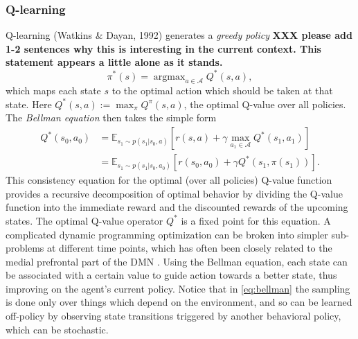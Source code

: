 \documentclass[10pt,letterpaper]{article}
\DeclareMathOperator{\argmax}{argmax}
\begin{document}
\subsubsection{Q-learning} Q-learning (Watkins \& Dayan, 1992) generates a
\textit{greedy policy}
\textbf{XXX please add 1-2 sentences why this is interesting in the current
context. This statement appears a little alone as it stands.}
\begin{equation}
  \pi^*(s) = \argmax_{a \in \mathcal A}{Q}^*(s, a),
  \label{eq:qlearning}
\end{equation}
which maps each state $s$ to the optimal action which should be taken at that state.
Here $Q^*(s, a) := \max_{\pi}Q^\pi(s,a)$, the optimal Q-value over all policies.
The \textit{Bellman equation} \citep{sutton1998reinforcement} then takes the simple form
\begin{equation}
  \begin{split}
    Q^*(s_0, a_0) &= \mathbb E_{s_1 \sim p(s_1|s_0,a)} [r(s,a) + \gamma \max_{a_1 \in \mathcal A}Q^*(s_1, a_1)]
    \\
    &= \mathbb E_{s_1 \sim p(s_1|s_0,a_0)} [r(s_0,a_0) + \gamma Q^*(s_1, \pi(s_1))].
  \end{split}
  \label{eq:bellman}
\end{equation}
This consistency equation for the optimal (over all policies) Q-value function provides
a recursive decomposition of optimal behavior by dividing the Q-value function into the immediate
reward and the discounted rewards of the upcoming states. The optimal Q-value operator $Q^*$
is a fixed point for this equation. A complicated dynamic programming optimization can be
broken into simpler sub-problems at different time points,
which has often been closely related to the medial prefrontal part of the DMN
\citep{koechlin1999role, braver2002role}.
Using the Bellman equation, each state can be associated with a certain value
to guide action towards a better state, thus improving on the agent's current policy.
Notice that in \eqref{eq:bellman} the sampling is done only over things which
depend on the environment, and so can be learned off-policy by observing state transitions
triggered by another behavioral policy, which can be stochastic.
\end{document}
